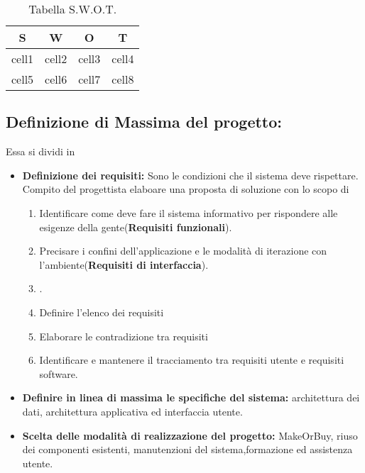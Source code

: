 \documentclass{article}
\begin{document}
\begin{table}[h!]
\begin{center}
\begin{tabular}{ |c|c|c|c| } 
 \hline
 S & W & O & T \\ [0.5ex] 
 \hline\hline
 cell1 & cell2 & cell3 & cell4 \\
 cell5 & cell6 & cell7 & cell8 \\
 \hline
\end{tabular}
\end{center}
\caption{Tabella S.W.O.T.}
\label{swot}
\end{table}




\subsection{Definizione di Massima del progetto:}
Essa si dividi in
\begin{itemize}
    \item \textbf{Definizione dei requisiti:} Sono le condizioni che il sistema deve rispettare. 		Compito del progettista elaboare una proposta di soluzione con lo scopo di
    \begin{enumerate}
        \item Identificare come deve fare il sistema informativo per rispondere alle esigenze della gente(\textbf{Requisiti funzionali}).
        \item Precisare i confini dell'applicazione e le modalità di iterazione con l'ambiente(\textbf{Requisiti di interfaccia}).
        \item .
        \item Definire l'elenco dei requisiti
        \item Elaborare le contradizione tra requisiti
        \item Identificare e mantenere il tracciamento tra requisiti utente e requisiti software.
    \end{enumerate}
    \item \textbf{Definire in linea di massima le specifiche del sistema:} architettura dei dati, architettura applicativa ed interfaccia utente.
    \item \textbf{Scelta delle modalità di realizzazione del progetto:} MakeOrBuy, riuso dei componenti esistenti, manutenzioni del sistema,formazione ed assistenza utente.
\end{itemize}
\end{document}
